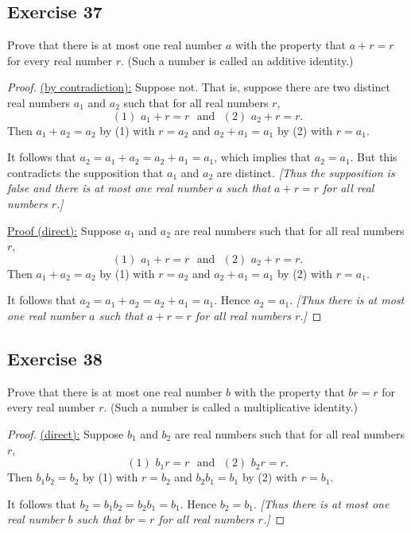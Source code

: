 \documentclass[14pt]{extarticle}
\begin{document}
\subsection{Exercise 37}
Prove that there is at most one real number $a$ with the property that $a + r = r$ for every real number $r$. (Such a number is called an additive identity.)

\begin{proof}
\underline{(by contradiction):} Suppose not. That is, suppose there are two distinct real numbers $a_1$ and $a_2$ such that for all real numbers $r$,
\[
(1) \,\, a_1 + r = r \,\,\text{ and }\,\, (2) \,\, a_2 + r = r.
\]
Then $a_1 + a_2 = a_2$ by (1) with $r = a_2$ and $a_2 + a_1 = a_1$ by (2) with $r = a_1$.

It follows that $a_2 = a_1 + a_2 = a_2 + a_1 = a_1$, which implies that $a_2 = a_1$. But this contradicts the supposition that $a_1$ and $a_2$ are distinct. {\it [Thus the supposition is false and there is at most one real number $a$ such that $a + r = r$ for all real numbers $r$.]}

\underline{Proof (direct):} Suppose $a_1$ and $a_2$ are real numbers such that for all real numbers $r$,
\[
(1) \,\, a_1 + r = r \,\,\text{ and }\,\, (2) \,\, a_2 + r = r.
\]
Then $a_1 + a_2 = a_2$ by (1) with $r = a_2$ and $a_2 + a_1 = a_1$ by (2) with $r = a_1$.

It follows that $a_2 = a_1 + a_2 = a_2 + a_1 = a_1$. Hence $a_2 = a_1$. {\it [Thus there is at most one real number $a$ such that $a + r = r$ for all real numbers $r$.]}
\end{proof}

\subsection{Exercise 38}
Prove that there is at most one real number $b$ with the property that $br = r$ for every real number $r$. (Such a number is called a multiplicative identity.)

\begin{proof}
\underline{(direct):} Suppose $b_1$ and $b_2$ are real numbers such that for all real numbers $r$,
\[
(1) \,\, b_1 r = r \,\,\text{ and }\,\, (2) \,\, b_2 r = r.
\]
Then $b_1 b_2 = b_2$ by (1) with $r = b_2$ and $b_2 b_1 = b_1$ by (2) with $r = b_1$.

It follows that $b_2 = b_1 b_2 = b_2 b_1 = b_1$. Hence $b_2 = b_1$. {\it [Thus there is at most one real number $b$ such that $br = r$ for all real numbers $r$.]}
\end{proof}
\end{document}
